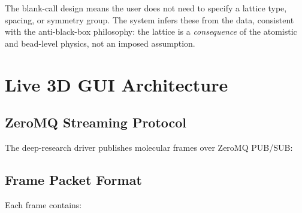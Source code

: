 \documentclass[11pt,a4paper]{article}
\begin{document}
The blank-call design means the user does not need to specify a lattice
type, spacing, or symmetry group.  The system infers these from the
data, consistent with the anti-black-box philosophy: the lattice is
a \emph{consequence} of the atomistic and bead-level physics, not an
imposed assumption.

\section{Live 3D GUI Architecture}
\label{sec:gui}

\subsection{ZeroMQ Streaming Protocol}

The deep-research driver publishes molecular frames over ZeroMQ PUB/SUB:

\begin{center}
\end{center}

\subsection{Frame Packet Format}

Each frame contains:
\end{document}
